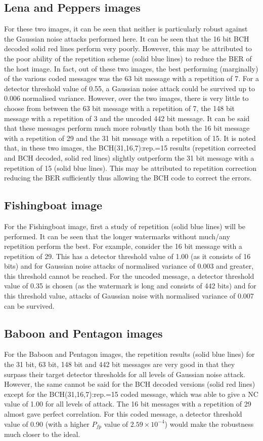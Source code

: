 \documentclass[12pt]{report}
\begin{document}
\subsection{Lena and Peppers images}
For these two images, it can be seen that neither is particularly robust against the Gaussian noise attacks
performed here. It can be seen that the 16 bit BCH decoded solid red lines perform very
poorly. However, this may be attributed to the poor ability of the repetition scheme (solid blue lines) to reduce the BER
of the host image. In fact, out of these two images, the best performing (marginally) of the various coded
messages was the 63 bit message with a repetition of 7. For a detector threshold value of 0.55, a Gaussian noise attack could be
survived up to 0.006 normalised variance. However, over the two images, there is very little to choose from 
between the 63 bit message with a repetition of 7, the 148 bit message with a repetition of 3 and 
the uncoded 442 bit message. It can be said that
these messages perform much more robustly than both the 16 bit message with a repetition of 29 and 
the 31 bit message with a repetition of 15.
It is noted that, in these two images, the BCH(31,16,7):rep.=15 results (repetition corrected and BCH decoded, solid red lines)
slightly outperform the 31 bit message with a repetition of 15 (solid blue lines). 
This may be attributed to repetition correction reducing the BER sufficiently thus allowing the BCH code to correct the errors. 

\subsection{Fishingboat image}
For the Fishingboat image, first a study of repetition (solid blue lines) will be performed.
It can be seen that the longer watermarks without much/any repetition perform the best.
For example, consider the 16 bit message with a repetition of 29.
This has a detector threshold value of 1.00 (as it consists of 16 bits) and for Gaussian noise attacks of normalised variance
of 0.003 and greater, this threshold cannot be reached. For the uncoded message, a detector threshold value
of 0.35 is chosen (as the watermark is long and consists of 442 bits) and for this threshold value, attacks of Gaussian noise with normalised variance of 
0.007 can be survived.

\subsection{Baboon and Pentagon images}
For the Baboon and Pentagon images, the repetition results (solid blue lines) 
for the
31 bit, 63 bit, 148 bit and 442 bit messages 
are very good in that they surpass their target detector thresholds for all levels of Gaussian noise attack. However,
the same cannot be said for the BCH decoded versions (solid red lines)
except for the BCH(31,16,7):rep.=15 coded message, which was able to give a NC value of 1.00 for 
all levels of attack.
The 16 bit messages with a repetition of 29 almost gave perfect correlation.
For this coded message, a detector threshold value of 0.90 (with a higher $P_{fp}$ value of
$2.59\times 10^{-4}$) would make the robustness much closer to the ideal. 
\end{document}
